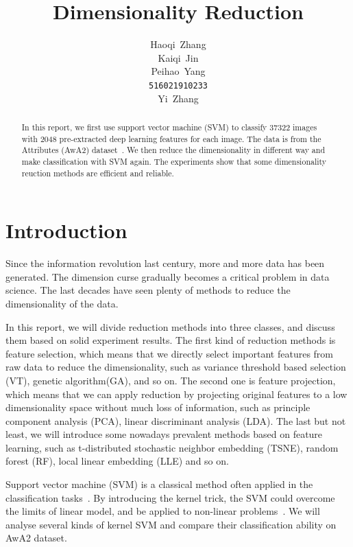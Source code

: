 \documentclass{article}
\title{Dimensionality Reduction}
\author{
  Haoqi~Zhang\\
  \And
  Kaiqi~Jin\\
  \And
  Peihao~Yang\\
  \texttt{516021910233} \\
  \And
  Yi~Zhang\\
}
\begin{document}
\maketitle

\begin{abstract}
In this report, we first use support vector machine (SVM) to classify 37322 images with 2048 pre-extracted deep learning features for each image. The data is from the Attributes (AwA2) dataset~\cite{awa2}. We then reduce the dimensionality in different way and make classification with SVM again. The experiments show that some dimensionality reuction methods are efficient and reliable.
\end{abstract}




\section{Introduction}
Since the information revolution last century, more and more data has been generated. The dimension curse gradually becomes a critical problem in data science. The last decades have seen plenty of methods to reduce the dimensionality of the data. 

In this report, we will divide reduction methods into three classes, and discuss them based on solid experiment results. The first kind of reduction methods is feature selection, which means that we directly select important features from raw data to reduce the dimensionality, such as variance threshold based selection (VT), genetic algorithm(GA), and so on. The second one is feature projection, which means that we can apply reduction by projecting original features to a low dimensionality space without much loss of information, such as principle component analysis (PCA), linear discriminant analysis (LDA). The last but not least, we will introduce some nowadays prevalent methods based on feature learning, such as t-distributed stochastic neighbor embedding (TSNE), random forest (RF), local linear embedding (LLE) and so on.

Support vector machine (SVM) is a classical method often applied in the classification tasks~\cite{SVM}. By introducing the kernel trick, the SVM could overcome the limits of linear model, and be applied to non-linear problems~\cite{kernel}. We will analyse several kinds of kernel SVM and compare their classification ability on AwA2 dataset.
\end{document}
